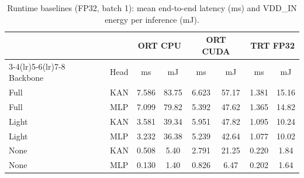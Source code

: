 \begin{table}[t]
\centering
\caption{Runtime baselines (FP32, batch 1): mean end-to-end latency (ms) and VDD\_IN energy per inference (mJ).}
\label{tab:runtimes}
\setlength{\tabcolsep}{3.5pt}
\small
\begin{tabular}{llcccccc}
\toprule
 & & \multicolumn{2}{c}{ORT CPU} & \multicolumn{2}{c}{ORT CUDA} & \multicolumn{2}{c}{TRT FP32} \\
\cmidrule(lr){3-4}\cmidrule(lr){5-6}\cmidrule(lr){7-8}
Backbone & Head & ms & mJ & ms & mJ & ms & mJ \\
\midrule
Full & KAN & 7.586 & 83.75 & 6.623 & 57.17 & 1.381 & 15.16 \\
Full & MLP & 7.099 & 79.82 & 5.392 & 47.62 & 1.365 & 14.82 \\
Light & KAN & 3.581 & 39.34 & 5.951 & 47.82 & 1.095 & 10.24 \\
Light & MLP & 3.232 & 36.38 & 5.239 & 42.64 & 1.077 & 10.02 \\
None & KAN & 0.508 & 5.40 & 2.791 & 21.25 & 0.220 & 1.84 \\
None & MLP & 0.130 & 1.40 & 0.826 & 6.47 & 0.202 & 1.64 \\
\bottomrule
\end{tabular}
\end{table}